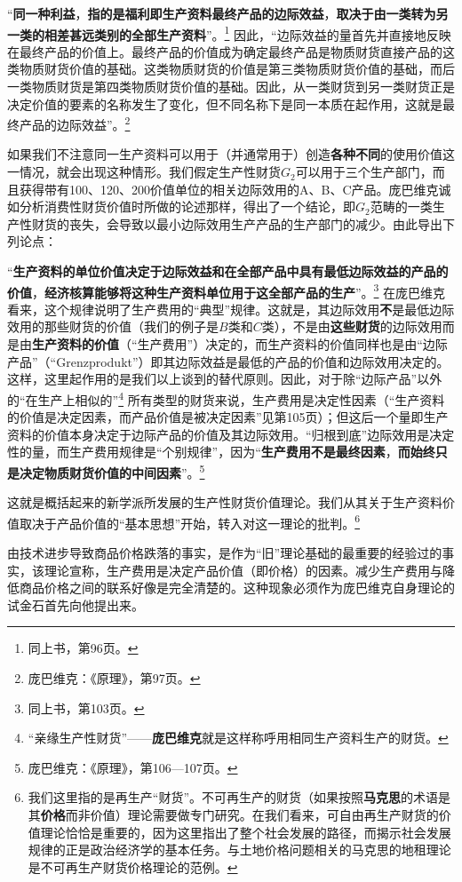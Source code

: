\documentclass[fontset=fandol, a4paper, 12pt, openright]{ctexbook}
\begin{document}
“\textbf{同一种利益}，\textbf{指的是福利即生产资料最终产品的边际效益}，\textbf{取决于由一类转为另一类的相差甚远类别的全部生产资料}”。\footnote{同上书，第96页。} 因此，“边际效益的量首先并直接地反映在最终产品的价值上。最终产品的价值成为确定最终产品是物质财货直接产品的这类物质财货价值的基础。这类物质财货的价值是第三类物质财货价值的基础，而后一类物质财货是第四类物质财货价值的基础。因此，从一类财货到另一类财货正是决定价值的要素的名称发生了变化，但不同名称下是同一本质在起作用，这就是最终产品的边际效益”。\footnote{庞巴维克：《原理》，第97页。}

如果我们不注意同一生产资料可以用于（并通常用于）创造\textbf{各种不同}的使用价值这一情况，就会出现这种情形。我们假定生产性财货$G_2$可以用于三个生产部门，而且获得带有100、120、200价值单位的相关边际效用的A、B、C产品。庞巴维克诚如分析消费性财货价值时所做的论述那样，得出了一个结论，即$G_2$范畴的一类生产性财货的丧失，会导致以最小边际效用生产产品的生产部门的减少。由此导出下列论点：

“\textbf{生产资料的单位价值决定于边际效益和在全部产品中具有最低边际效益的产品的价值}，\textbf{经济核算能够将这种生产资料单位用于这全部产品的生产}”。\footnote{同上书，第103页。} 在庞巴维克看来，这个规律说明了生产费用的“典型”规律。这就是，其边际效用\textbf{不}是最低边际效用的那些财货的价值（我们的例子是$B$类和$C$类），不是由\textbf{这些财货}的边际效用而是由\textbf{生产资料的价值}（“生产费用”）决定的，而生产资料的价值同样也是由“边际产品”（“Grenzprodukt”）即其边际效益是最低的产品的价值和边际效用决定的。这样，这里起作用的是我们以上谈到的替代原则。因此，对于除“边际产品”以外的“在生产上相似的”\footnote{“亲缘生产性财货”——\textbf{庞巴维克}就是这样称呼用相同生产资料生产的财货。} 所有类型的财货来说，生产费用是决定性因素（“生产资料的价值是决定因素，而产品价值是被决定因素”见第105页）；但这后一个量即生产资料的价值本身决定于边际产品的价值及其边际效用。“归根到底”边际效用是决定性的量，而生产费用规律是“个别规律”，因为“\textbf{生产费用不是最终因素}，\textbf{而始终只是决定物质财货价值的中间因素}”。\footnote{庞巴维克：《原理》，第106—107页。}

这就是概括起来的新学派所发展的生产性财货价值理论。我们从其关于生产资料价值取决于产品价值的“基本思想”开始，转入对这一理论的批判。\footnote{我们这里指的是再生产“财货”。不可再生产的财货（如果按照\textbf{马克思}的术语是其\textbf{价格}而非价值）理论需要做专门研究。在我们看来，可自由再生产财货的价值理论恰恰是重要的，因为这里指出了整个社会发展的路径，而揭示社会发展规律的正是政治经济学的基本任务。与土地价格问题相关的马克思的地租理论是不可再生产财货价格理论的范例。}

由技术进步导致商品价格跌落的事实，是作为“旧”理论基础的最重要的经验过的事实，该理论宣称，生产费用是决定产品价值（即价格）的因素。减少生产费用与降低商品价格之间的联系好像是完全清楚的。这种现象必须作为庞巴维克自身理论的试金石首先向他提出来。
\end{document}
